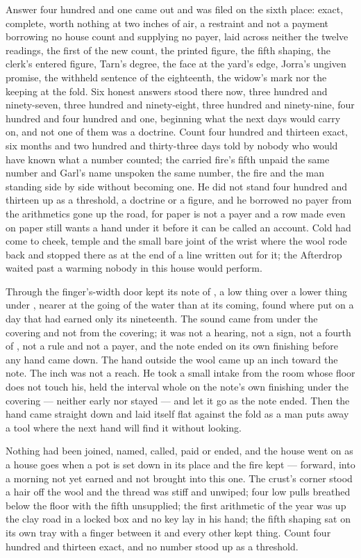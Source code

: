 Answer four hundred and one came out and was filed on the sixth place: exact, complete, worth nothing at two inches of air, a restraint and not a payment borrowing no house count and supplying no payer, laid across neither the twelve readings, the first of the new count, the printed figure, the fifth shaping, the clerk's entered figure, Tarn's degree, the face at the yard's edge, Jorra's ungiven promise, the withheld sentence of the eighteenth, the widow's mark nor the keeping at the fold. Six honest answers stood there now, three hundred and ninety-seven, three hundred and ninety-eight, three hundred and ninety-nine, four hundred and four hundred and one, beginning what the next days would carry on, and not one of them was a doctrine. Count four hundred and thirteen exact, six months and two hundred and thirty-three days told by nobody who would have known what a number counted; the carried fire's fifth unpaid the same number and Garl's name unspoken the same number, the fire and the man standing side by side without becoming one. He did not stand four hundred and thirteen up as a threshold, a doctrine or a figure, and he borrowed no payer from the arithmetics gone up the road, for paper is not a payer and a row made even on paper still wants a hand under it before it can be called an account. Cold had come to cheek, temple and the small bare joint of the wrist where the wool rode back and stopped there as at the end of a line written out for it; the Afterdrop waited past a warming nobody in this house would perform.

Through the finger's-width door  kept its note of , a low thing over a lower thing under , nearer at the going of the water than at its coming, found where put on a day that had earned only its nineteenth. The sound came from under the covering and not from the covering; it was not a hearing, not a sign, not a fourth of , not a rule and not a payer, and the note ended on its own finishing before any hand came down. The hand outside the wool came up an inch toward the note. The inch was not a reach. He took a small intake from the room whose floor does not touch his, held the interval whole on the note's own finishing under the covering --- neither early nor stayed --- and let it go as the note ended. Then the hand came straight down and laid itself flat against the fold as a man puts away a tool where the next hand will find it without looking.

Nothing had been joined, named, called, paid or ended, and the house went on as a house goes when a pot is set down in its place and the fire kept --- forward, into a morning not yet earned and not brought into this one. The crust's corner stood a hair off the wool and the thread was stiff and unwiped; four low pulls breathed below the floor with the fifth unsupplied; the first arithmetic of the year was up the clay road in a locked box and no key lay in his hand; the fifth shaping sat on its own tray with a finger between it and every other kept thing. Count four hundred and thirteen exact, and no number stood up as a threshold.
